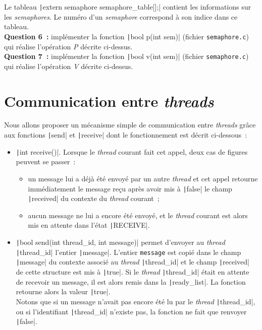 \documentclass[a4paper]{article}
\begin{document}
Le tableau \texttt|extern semaphore semaphore_table[];| 
contient les informations sur les \emph{semaphores}. Le numéro d'un \emph{semaphore} correspond à son indice dans ce tableau.\\

\textbf{Question 6~:} implémenter la fonction \texttt|bool p(int sem)| (fichier \verb+semaphore.c+) qui réalise l'opération \emph{P} décrite ci-dessus.\\

\textbf{Question 7~:} implémenter la fonction \texttt|bool v(int sem)| (fichier \verb+semaphore.c+) qui réalise l'opération \emph{V} décrite ci-dessus.\\

\section{Communication entre \emph{threads}}

Nous allons proposer un mécanisme simple de communication entre \emph{threads} grâce aux fonctions \texttt|send| et \texttt|receive| dont
le fonctionnement est décrit ci-dessous~:\\

\begin{itemize}

\item \texttt|int receive()|. Lorsque le \emph{thread} courant fait cet appel, deux cas de figures peuvent se passer~:
\begin{itemize}
\item un message lui a déjà été envoyé par un autre \emph{thread} et cet appel retourne immédiatement le message reçu après avoir
mis à \texttt|false| le champ \texttt|received| du contexte du \emph{thread} courant~;
\item aucun message ne lui a encore été envoyé, et le \emph{thread} courant est alors mis en attente dans l'état \texttt|RECEIVE|.\\
\end{itemize}

\item \texttt|bool send(int thread_id, int message)| permet d'envoyer au \emph{thread} \texttt|thread_id| l'entier \texttt|message|.
L'entier
\verb+message+ est copié dans le champ \texttt|message| du contexte associé au \emph{thread} \texttt|thread_id| et le champ
\texttt|received| de cette structure est mis à \texttt|true|. Si le \emph{thread} \texttt|thread_id| était en attente de recevoir un message, 
il est alors remis dans la \texttt|ready_list|. La fonction retourne alors la valeur \texttt|true|.\\
Notons que si un message
n'avait pas encore été lu par le \emph{thread} \texttt|thread_id|, ou si l'identifiant \texttt|thread_id| n'existe pas, la fonction ne fait que renvoyer
\texttt|false|.\\

\end{itemize}
\end{document}
